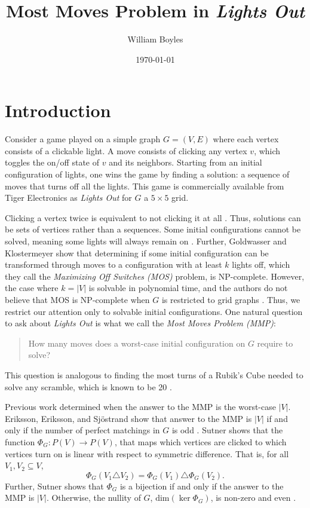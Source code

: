 \documentclass[a4paper]{article}
\newcommand{\abs}[1]{\left| #1 \right|}
\renewcommand{\dim}[1]{\text{dim}\left( #1 \right)}
\begin{document}
	\title{Most Moves Problem in \textit{Lights Out}}
	\author{William Boyles}
	\date{\today}
	\maketitle
	
	\section{Introduction}
	Consider a game played on a simple graph $G=(V,E)$ where each vertex consists of a clickable light.
	A move consists of clicking any vertex $v$, which toggles the on/off state of $v$ and its neighbors.
	Starting from an initial configuration of lights, one wins the game by finding a solution: a sequence of moves that turns off all the lights.
	This game is commercially available from Tiger Electronics as \textit{Lights Out} for $G$ a $5 \times 5$ grid. 
	
	Clicking a vertex twice is equivalent to not clicking it at all \cite{Sutner1989}.
	Thus, solutions can be sets of vertices rather than a sequences.
	Some initial configurations cannot be solved, meaning some lights will always remain on \cite{anderson_feil}.
	Further, Goldwasser and Klostermeyer show that determining if some initial configuration can be transformed through moves to a configuration with at least $k$ lights off, which they call the \textit{Maximizing Off Switches (MOS)} problem, is NP-complete.
	However, the case where $k=\abs{V}$ is solvable in polynomial time, and the authors do not believe that MOS is NP-complete when $G$ is restricted to grid graphs \cite{Goldwasser2000}.
	Thus, we restrict our attention only to solvable initial configurations.
	One natural question to ask about \textit{Lights Out} is what we call the \textit{Most Moves Problem (MMP)}:
	\begin{quote}
		How many moves does a worst-case initial configuration on $G$ require to solve?
	\end{quote}
	This question is analogous to finding the most turns of a Rubik's Cube needed to solve any scramble, which is known to be 20 \cite{Rockiki2013}. 
	
	Previous work determined when the answer to the MMP is the worst-case $\abs{V}$.
	Eriksson, Eriksson, and Sjöstrand show that answer to the MMP is $\abs{V}$ if and only if the number of perfect matchings in $G$ is odd \cite{ERIKSSON2001357}.
	Sutner shows that the function $\Phi_G: P(V) \to P(V)$, that maps which vertices are clicked to which vertices turn on is linear with respect to symmetric difference.
	That is, for all $V_1, V_2 \subseteq V$,
	\begin{equation*}
		\Phi_G(V_1 \triangle V_2) = \Phi_G(V_1) \triangle \Phi_G(V_2).
	\end{equation*}
	Further, Sutner shows that $\Phi_G$ is a bijection if and only if the answer to the MMP is $\abs{V}$.
	Otherwise, the nullity of $G$, $\dim{\ker{\Phi_G}}$, is non-zero and even \cite{Sutner1989}.
	
\end{document}
